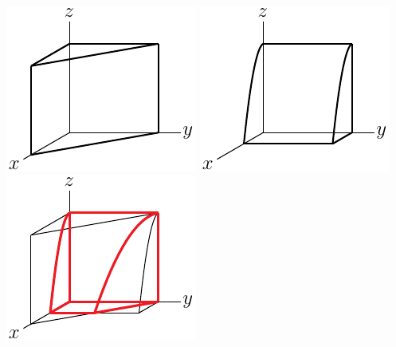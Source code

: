 \begin{eg}
\begin{wfig}
\begin{center}
    \includegraphics{limits3dA.pdf}\qquad
    \includegraphics{limits3dB.pdf}\qquad
    \includegraphics{limits3dC.pdf}
\end{center}
\end{wfig}



\end{eg}
